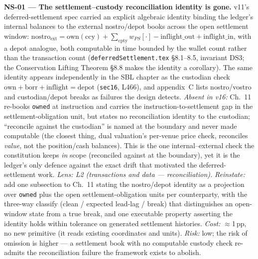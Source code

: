 \documentclass[11pt]{article}
\begin{document}
\textbf{NS-01 --- The settlement--custody reconciliation identity is gone.}
v11's deferred-settlement spec carried an explicit algebraic identity binding the ledger's
internal balances to the external nostro/depot books across the open settlement window:
$\mathrm{nostro}_{\mathrm{ext}} = \mathrm{own}(\mathrm{ccy}) + \sum_{\mathrm{cpty}}
w_{PS}[\cdot] - \mathrm{inflight\_out} + \mathrm{inflight\_in}$, with a depot analogue, both
computable in time bounded by the wallet count rather than the transaction count
(\texttt{deferredSettlement.tex} \S8.1--8.5, invariant DS3; the Conservation Lifting Theorem
\S8.8 makes the identity a corollary). The same identity appears independently in the SBL chapter as the custodian check
$\mathrm{own}+\mathrm{borr}+\mathrm{inflight}=\mathrm{depot}$ (\texttt{sec16}, L466), and
appendix~C lists nostro/vostro and custodian/depot breaks as failures the design detects.
\emph{Absent in v16:} Ch.~11 re-books \texttt{owned} at
instruction and carries the instruction-to-settlement gap in the settlement-obligation unit,
but states no reconciliation identity to the custodian; ``reconcile against the custodian'' is
named at the boundary and never made computable (the closest thing, dual valuation's per-venue
price check, reconciles \emph{value}, not the position/cash balances). This is the one
internal--external check the constitution keeps \emph{in} scope (reconciled against at the
boundary), yet it is the ledger's only defence against the exact drift that motivated the
deferred-settlement work. \emph{Lens:
L2 (transactions and data --- reconciliation).} \emph{Reinstate:} add one subsection to Ch.~11
stating the nostro/depot identity as a projection over \texttt{owned} plus the open
settlement-obligation units per counterparty, with the three-way classify (clean /
expected lead-lag / break) that distinguishes an open-window state from a true break, and one
executable property asserting the identity holds within tolerance on generated settlement
histories. \emph{Cost:} $\approx$1\,pp, no new primitive (it reads existing coordinates and
units). \emph{Risk:} low; the risk of omission is higher --- a settlement book with no
computable custody check re-admits the reconciliation failure the framework exists to abolish.
\end{document}
